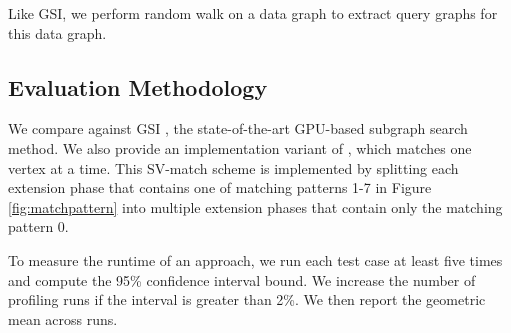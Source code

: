  Like GSI, we perform random walk on a data graph to extract query graphs for this data graph.

\subsection{Evaluation Methodology}
 We compare \SystemName against GSI \cite{zeng2020gsi}, the state-of-the-art GPU-based subgraph search
method. We also provide an implementation variant of \SystemName, which matches one vertex at a time. This SV-match scheme is implemented
by splitting each extension phase that contains one of matching patterns 1-7 in Figure \ref {fig:matchpattern} into multiple extension
phases that contain only the matching pattern 0.

 To measure the runtime of an approach, we run each test case at least five times and compute the 95\%
confidence interval bound. We increase the number of profiling runs if the interval is greater than 2\%. We then report the geometric mean
across runs.
